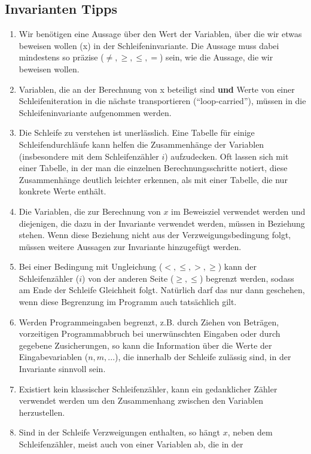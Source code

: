 \documentclass[a4paper,8pt,landscape]{extarticle}
\begin{document}
\begin{multicols*}{3}
    \subsection{Invarianten Tipps}
    \begin{enumerate}
     \item Wir benötigen eine Aussage über den Wert der Variablen, über die
wir etwas beweisen wollen (x) in der Schleifeninvariante. Die
Aussage muss dabei mindestens so präzise ($\neq, \geq, \leq, =$) sein, wie
die Aussage, die wir beweisen wollen.
      \item Variablen, die an der Berechnung von x beteiligt sind \textbf{und} Werte
von einer Schleifeniteration in die nächste transportieren
(“loop-carried”), müssen in die Schleifeninvariante aufgenommen
werden.
      \item Die Schleife zu verstehen ist unerlässlich. Eine Tabelle für einige
Schleifendurchläufe kann helfen die Zusammenhänge der Variablen
(insbesondere mit dem Schleifenzähler $i$) aufzudecken. Oft lassen
sich mit einer Tabelle, in der man die einzelnen
Berechnungsschritte notiert, diese Zusammenhänge deutlich
leichter erkennen, als mit einer Tabelle, die nur konkrete Werte
enthält.
      \item Die Variablen, die zur Berechnung von $x$ im Beweisziel verwendet
werden und diejenigen, die dazu in der Invariante verwendet
werden, müssen in Beziehung stehen. Wenn diese Beziehung nicht
aus der Verzweigungsbedingung folgt, müssen weitere Aussagen
zur Invariante hinzugefügt werden.
      \item Bei einer Bedingung mit Ungleichung ($<, \leq, >, \geq$) kann der
Schleifenzähler ($i$) von der anderen Seite ($\geq, \leq$) begrenzt werden,
sodass am Ende der Schleife Gleichheit folgt. Natürlich darf das
nur dann geschehen, wenn diese Begrenzung im Programm auch
tatsächlich gilt.
      \item Werden Programmeingaben begrenzt, z.B. durch Ziehen von
Beträgen, vorzeitigen Programmabbruch bei unerwünschten
Eingaben oder durch gegebene Zusicherungen, so kann die
Information über die Werte der Eingabevariablen ($n, m, ...$), die
innerhalb der Schleife zulässig sind, in der Invariante sinnvoll sein.
      \item Existiert kein klassischer Schleifenzähler, kann ein gedanklicher
Zähler verwendet werden um den Zusammenhang zwischen den
Variablen herzustellen.
      \item Sind in der Schleife Verzweigungen enthalten, so hängt $x$, neben
dem Schleifenzähler, meist auch von einer Variablen ab, die in der

\end{enumerate}
\end{multicols*}
\end{document}
